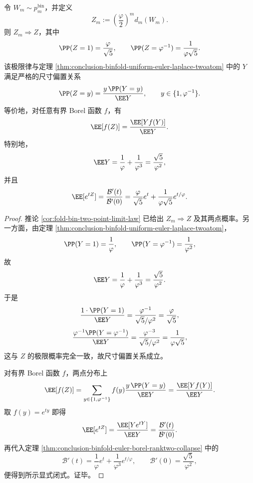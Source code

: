 \begin{theorem}[微态推前极限律是稳定层极限律的精确尺寸偏置]\label{thm:conclusion-binfold-pushforward-exact-size-bias}
令 \(W_m\sim p_m^{\mathrm{bin}}\)，并定义
\[
Z_m:=\left(\frac{\varphi}{2}\right)^m d_m(W_m).
\]
则 \(Z_m\Rightarrow Z\)，其中
\[
\PP(Z=1)=\frac{\varphi}{\sqrt5},
\qquad
\PP(Z=\varphi^{-1})=\frac{1}{\varphi\sqrt5}.
\]
该极限律与定理 \ref{thm:conclusion-binfold-uniform-euler-laplace-twoatom} 中的 \(Y\) 满足严格的尺寸偏置关系
\[
\PP(Z=y)=\frac{y\,\PP(Y=y)}{\EE Y},
\qquad
y\in\{1,\varphi^{-1}\}.
\]
等价地，对任意有界 Borel 函数 \(f\)，有
\[
\EE[f(Z)]
=
\frac{\EE[Yf(Y)]}{\EE Y}.
\]
特别地，
\[
\EE Y=\frac{1}{\varphi}+\frac{1}{\varphi^3}=\frac{\sqrt5}{\varphi^2},
\]
并且
\[
\EE[e^{tZ}]
=
\frac{\mathcal B'(t)}{\mathcal B'(0)}
=
\frac{\varphi}{\sqrt5}e^t+\frac{1}{\varphi\sqrt5}e^{t/\varphi}.
\]
\end{theorem}
\begin{proof}
推论 \ref{cor:fold-bin-two-point-limit-law} 已给出 \(Z_m\Rightarrow Z\) 及其两点概率。另一方面，由定理 \ref{thm:conclusion-binfold-uniform-euler-laplace-twoatom}，
\[
\PP(Y=1)=\frac{1}{\varphi},
\qquad
\PP(Y=\varphi^{-1})=\frac{1}{\varphi^2},
\]
故
\[
\EE Y=\frac{1}{\varphi}+\frac{1}{\varphi^3}
=\frac{\sqrt5}{\varphi^2}.
\]
于是
\[
\frac{1\cdot \PP(Y=1)}{\EE Y}
=
\frac{\varphi^{-1}}{\sqrt5/\varphi^2}
=
\frac{\varphi}{\sqrt5},
\]
\[
\frac{\varphi^{-1}\PP(Y=\varphi^{-1})}{\EE Y}
=
\frac{\varphi^{-3}}{\sqrt5/\varphi^2}
=
\frac{1}{\varphi\sqrt5},
\]
这与 \(Z\) 的极限概率完全一致，故尺寸偏置关系成立。

对有界 Borel 函数 \(f\)，两点分布上
\[
\EE[f(Z)]
=
\sum_{y\in\{1,\varphi^{-1}\}}
f(y)\frac{y\,\PP(Y=y)}{\EE Y}
=
\frac{\EE[Yf(Y)]}{\EE Y}.
\]
取 \(f(y)=e^{ty}\) 即得
\[
\EE[e^{tZ}]
=
\frac{\EE[Ye^{tY}]}{\EE Y}
=
\frac{\mathcal B'(t)}{\mathcal B'(0)}.
\]
再代入定理 \ref{thm:conclusion-binfold-euler-borel-ranktwo-collapse} 中的
\[
\mathcal B'(t)=\frac{1}{\varphi}e^t+\frac{1}{\varphi^3}e^{t/\varphi},
\qquad
\mathcal B'(0)=\frac{\sqrt5}{\varphi^2},
\]
便得到所示显式闭式。证毕。
\end{proof}

